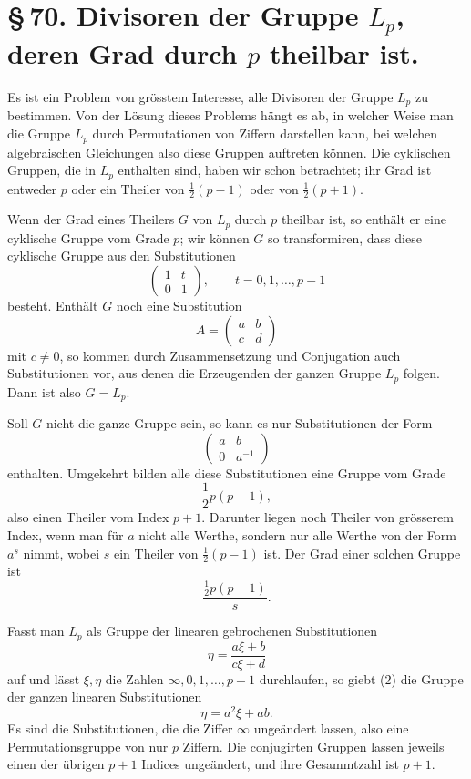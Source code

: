 \documentclass[11pt]{article}
\providecommand{\mat}[4]{\begin{pmatrix}#1&#2\\#3&#4\end{pmatrix}}
\providecommand{\mat}[4]{\begin{pmatrix}#1&#2\\#3&#4\end{pmatrix}}
\begin{document}
\section*{\S\,70. Divisoren der Gruppe $L_p$, deren Grad durch $p$ theilbar ist.}

Es ist ein Problem von grösstem Interesse, alle Divisoren der Gruppe $L_p$ zu bestimmen. Von der Lösung dieses Problems hängt es ab, in welcher Weise man die Gruppe $L_p$ durch Permutationen von Ziffern darstellen kann, bei welchen algebraischen Gleichungen also diese Gruppen auftreten können. Die cyklischen Gruppen, die in $L_p$ enthalten sind, haben wir schon betrachtet; ihr Grad ist entweder $p$ oder ein Theiler von $\frac12(p-1)$ oder von $\frac12(p+1)$.

Wenn der Grad eines Theilers $G$ von $L_p$ durch $p$ theilbar ist, so enthält er eine cyklische Gruppe vom Grade $p$; wir können $G$ so transformiren, dass diese cyklische Gruppe aus den Substitutionen
\begin{equation}
 \mat{1}{t}{0}{1},\qquad t=0,1,\ldots,p-1
 \tag{1}
\end{equation}
besteht. Enthält $G$ noch eine Substitution
\[
 A=\mat{a}{b}{c}{d}
\]
mit $c\ne0$, so kommen durch Zusammensetzung und Conjugation auch Substitutionen vor, aus denen die Erzeugenden der ganzen Gruppe $L_p$ folgen. Dann ist also $G=L_p$.

Soll $G$ nicht die ganze Gruppe sein, so kann es nur Substitutionen der Form
\begin{equation}
 \mat{a}{b}{0}{a^{-1}}
 \tag{2}
\end{equation}
enthalten. Umgekehrt bilden alle diese Substitutionen eine Gruppe vom Grade
\[
 \frac12 p(p-1),
\]
also einen Theiler vom Index $p+1$. Darunter liegen noch Theiler von grösserem Index, wenn man für $a$ nicht alle Werthe, sondern nur alle Werthe von der Form $a^s$ nimmt, wobei $s$ ein Theiler von $\frac12(p-1)$ ist. Der Grad einer solchen Gruppe ist
\begin{equation}
 \frac{\frac12p(p-1)}{s}.
 \tag{3}
\end{equation}

Fasst man $L_p$ als Gruppe der linearen gebrochenen Substitutionen
\[
 \eta=\frac{a\xi+b}{c\xi+d}
\]
auf und lässt $\xi,\eta$ die Zahlen $\infty,0,1,\ldots,p-1$ durchlaufen, so giebt (2) die Gruppe der ganzen linearen Substitutionen
\[
 \eta=a^2\xi+ab.
\]
Es sind die Substitutionen, die die Ziffer $\infty$ ungeändert lassen, also eine Permutationsgruppe von nur $p$ Ziffern. Die conjugirten Gruppen lassen jeweils einen der übrigen $p+1$ Indices ungeändert, und ihre Gesammtzahl ist $p+1$.
\end{document}
